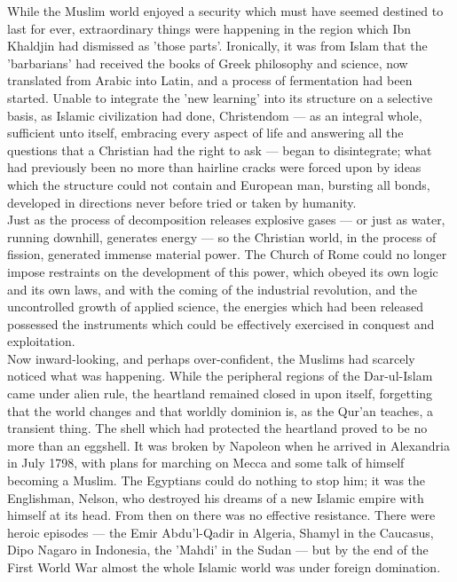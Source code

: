 \documentclass[11pt, b5paper, twoside]{book}
\begin{document}
While the Muslim world enjoyed a security which must have seemed destined to last for ever, extraordinary things were happening in the region which Ibn Khaldjin had dismissed as 'those parts'. Ironically, it was from Islam that the 'barbarians' had received the books of Greek philosophy and science, now translated from Arabic into Latin, and a process of fermentation had been started. Unable to integrate the 'new learning' into its structure on a selective basis, as Islamic civilization had done, Christendom --- as an integral whole, sufficient unto itself, embracing every aspect of life and answering all the questions that a Christian had the right to ask --- began to disintegrate; what had previously been no more than hairline cracks were forced upon by ideas which the structure could not contain and European man, bursting all bonds, developed in directions never before tried or taken by humanity. \\

Just as the process of decomposition releases explosive gases --- or just as water, running downhill, generates energy --- so the Christian world, in the process of fission, generated immense material power. The Church of Rome could no longer impose restraints on the development of this power, which obeyed its own logic and its own laws, and with the coming of the industrial revolution, and the uncontrolled growth of applied science, the energies which had been released possessed the instruments which could be effectively exercised in conquest and exploitation. \\

Now inward-looking, and perhaps over-confident, the Muslims had scarcely noticed what was happening. While the peripheral regions of the Dar-ul-Islam came under alien rule, the heartland remained closed in upon itself, forgetting that the world changes and that worldly dominion is, as the Qur'an teaches, a transient thing. The shell which had protected the heartland proved to be no more than an eggshell. It was broken by Napoleon when he arrived in Alexandria in July 1798, with plans for marching on Mecca and some talk of himself becoming a Muslim. The Egyptians could do nothing to stop him; it was the Englishman, Nelson, who destroyed his dreams of a new Islamic empire with himself at its head. From then on there was no effective resistance. There were heroic episodes --- the Emir Abdu'l-Qadir in Algeria, Shamyl in the Caucasus, Dipo Nagaro in Indonesia, the 'Mahdi' in the Sudan --- but by the end of the First World War almost the whole Islamic world was under foreign domination. \\
\end{document}

